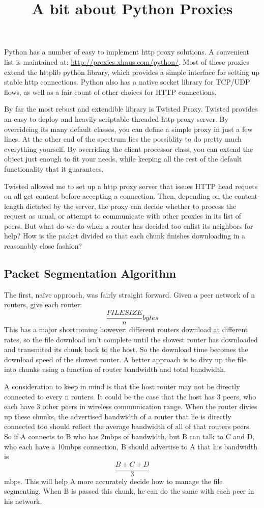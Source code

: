 \documentclass{article}
\title{A bit about Python Proxies}
\begin{document}
Python has a number of easy to implement http proxy solutions. A convenient list is maintained at: \url{http://proxies.xhaus.com/python/}. Most of these proxies extend the httplib python library, which provides a simple interface for setting up stable http connections. Python also has a native socket library for TCP/UDP flows, as well as a fair count of other choices for HTTP connections.

By far the most rebust and extendible library is Twisted Proxy. Twisted provides an easy to deploy and heavily scriptable threaded http proxy server. By overrideing its many default classes, you can define a simple proxy in just a few lines. At the other end of the spectrum lies the possiblity to do pretty much everything yourself. By overriding the client processor class, you can extend the object just enough to fit your needs, while keeping all the rest of the default functionality that it guarantees. 

Twisted allowed me to set up a http proxy server that issues HTTP head requets on all get content before accepting a connection. Then, depending on the content-length dictated by the server, the proxy can decide whether to process the request as usual, or attempt to communicate with other proxies in its list of peers. But what do we do when a router has decided too enlist its neighbors for help? How is the packet divided so that each chunk finishes downloading in a reasonably close fashion?

\subsection{Packet Segmentation Algorithm}

The first, na\"{i}ve approach, was fairly straight forward. Given a peer network of n routers, give each router: $$\frac{FILESIZE}{n} bytes$$ This has a major shortcoming however: different routers download at different rates, so the file download isn't complete until the slowest router has downloaded and transmited its chunk back to the host. So the download time becomes the download speed of the slowest router. A better approach is to divy up the file into chunks using a function of router bandwidth and total bandwidth. 

A consideration to keep in mind is that the host router may not be directly connected to every n routers. It could be the case that the host has 3 peers, who each have 3 other peers in wireless communication range. When the router divies up these chunks, the advertised bandwidth of a router that he is directly connected too should reflect the average bandwidth of all of that routers peers. So if A connects to B who has 2mbps of bandwidth, but B can talk to C and D, who each have a 10mbps connection, B should advertise to A that his bandwidth is $$\frac{B + C + D}{3}$$ mbps. This will help A more accurately decide how to manage the file segmenting. When B is passed this chunk, he can do the same with each peer in his network.
\end{document}
